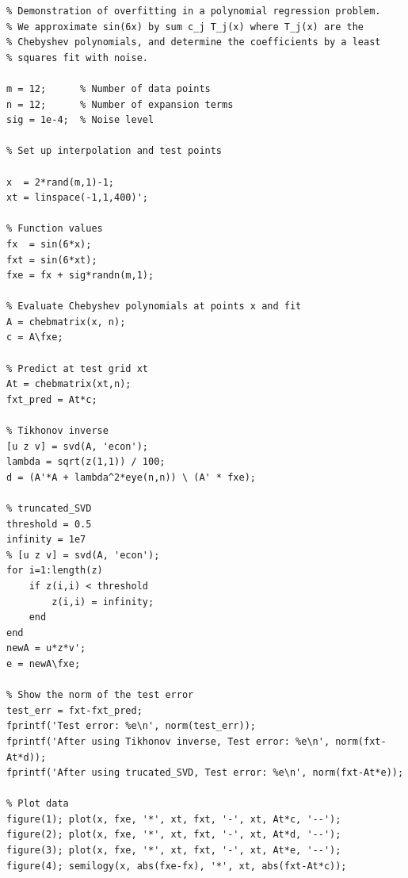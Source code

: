 \documentclass[a4paper, 11pt]{article}
\begin{document}
\lstset{
	language=Octave,
	xleftmargin=3em,
}
\begin{lstlisting}
% Demonstration of overfitting in a polynomial regression problem.
% We approximate sin(6x) by sum c_j T_j(x) where T_j(x) are the
% Chebyshev polynomials, and determine the coefficients by a least
% squares fit with noise.

m = 12;      % Number of data points
n = 12;      % Number of expansion terms
sig = 1e-4;  % Noise level

% Set up interpolation and test points

x  = 2*rand(m,1)-1;
xt = linspace(-1,1,400)';

% Function values
fx  = sin(6*x);
fxt = sin(6*xt);
fxe = fx + sig*randn(m,1);

% Evaluate Chebyshev polynomials at points x and fit
A = chebmatrix(x, n);
c = A\fxe;

% Predict at test grid xt
At = chebmatrix(xt,n);
fxt_pred = At*c;

% Tikhonov inverse
[u z v] = svd(A, 'econ');
lambda = sqrt(z(1,1)) / 100;
d = (A'*A + lambda^2*eye(n,n)) \ (A' * fxe);

% truncated_SVD
threshold = 0.5
infinity = 1e7
% [u z v] = svd(A, 'econ');
for i=1:length(z)
	if z(i,i) < threshold
		z(i,i) = infinity;
	end
end
newA = u*z*v';
e = newA\fxe;

% Show the norm of the test error
test_err = fxt-fxt_pred;
fprintf('Test error: %e\n', norm(test_err));
fprintf('After using Tikhonov inverse, Test error: %e\n', norm(fxt-At*d));
fprintf('After using trucated_SVD, Test error: %e\n', norm(fxt-At*e));

% Plot data
figure(1); plot(x, fxe, '*', xt, fxt, '-', xt, At*c, '--');
figure(2); plot(x, fxe, '*', xt, fxt, '-', xt, At*d, '--');
figure(3); plot(x, fxe, '*', xt, fxt, '-', xt, At*e, '--');
figure(4); semilogy(x, abs(fxe-fx), '*', xt, abs(fxt-At*c));

\end{lstlisting}
\end{document}
